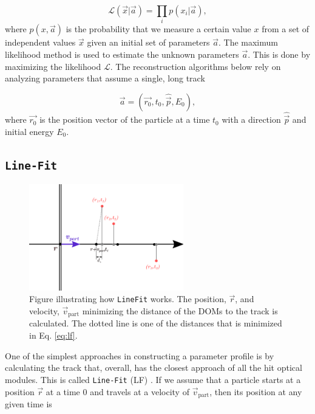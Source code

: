 \begin{equation}
\mathcal{L}(\vec{x}|\vec{a}) = \prod_i p(x_i|\vec{a}),
\end{equation}
\noindent where $p(x,\vec{a})$ is the probability that we measure a certain value $x$ from a set of independent values $\vec{x}$ given an initial set of parameters $\vec{a}$. The maximum likelihood method is used to estimate the unknown parameters $\vec{a}$. This is done by maximizing the likelihood $\mathcal{L}$. The reconstruction algorithms below rely on analyzing parameters that assume a single, long track

\begin{equation}
\label{eq:vec}
\vec{a} = (\vec{r_0},t_0,\hat{\vec{p}},E_0),
\end{equation}
\noindent where $\vec{r_0}$ is the position vector of the particle at a time $t_0$ with a direction $\hat{\vec{p}}$ and initial energy $E_0$. 

\subsection{\texttt{Line-Fit}}
\label{subsec:lf}

\begin{figure}
\centering
\includegraphics[width=0.6\textwidth]{chapter7/img/linefit2.png}
\caption{Figure illustrating how \texttt{LineFit} works. The position, $\vec{r}$, and velocity, $\vec{v}_\textrm{part}$ minimizing the distance of the DOMs to the track is calculated. The dotted line is one of the distances that is minimized in Eq. \ref{eq:lf}.}
\label{fig:lf}
\end{figure}

\noindent One of the simplest approaches in constructing a parameter profile is by calculating the track that, overall, has the closest approach of all the hit optical modules. This is called \texttt{Line-Fit} (LF) \cite{Ahrens:2003fg}. If we assume that a particle starts at a position $\vec{r}$ at a time 0 and travels at a velocity of $\vec{v}_\textrm{part}$, then its position at any given time is

